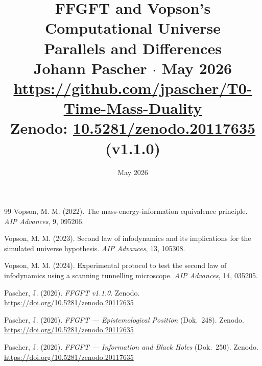 \documentclass[11pt]{report}
\title{%
    {\LARGE\bfseries\color{t0blue}
     FFGFT and Vopson's Computational Universe}\\[0.5em]
    {\large Parallels and Differences}\\[1em]
    {\normalsize Johann Pascher \quad $\cdot$ \quad May 2026}\\[0.3em]
    {\small \url{https://github.com/jpascher/T0-Time-Mass-Duality}}\\[0.3em]
    {\small Zenodo: \href{https://doi.org/10.5281/zenodo.20117635}{10.5281/zenodo.20117635} (v1.1.0)}
}
\date{May 2026}
\begin{document}
    \maketitle
    

    \begin{thebibliography}{99}
    Vopson, M. M. (2022). The mass-energy-information equivalence principle.
    \emph{AIP Advances}, 9, 095206.

    Vopson, M. M. (2023). Second law of infodynamics and its implications for the
    simulated universe hypothesis. \emph{AIP Advances}, 13, 105308.

    Vopson, M. M. (2024). Experimental protocol to test the second law of
    infodynamics using a scanning tunnelling microscope. \emph{AIP Advances}, 14, 035205.

    Pascher, J. (2026). \emph{FFGFT v1.1.0}. Zenodo.
    \url{https://doi.org/10.5281/zenodo.20117635}

    Pascher, J. (2026). \emph{FFGFT --- Epistemological Position} (Dok.~248).
    Zenodo. \url{https://doi.org/10.5281/zenodo.20117635}

    Pascher, J. (2026). \emph{FFGFT --- Information and Black Holes} (Dok.~250).
    Zenodo. \url{https://doi.org/10.5281/zenodo.20117635}
    \end{thebibliography}
\end{document}
